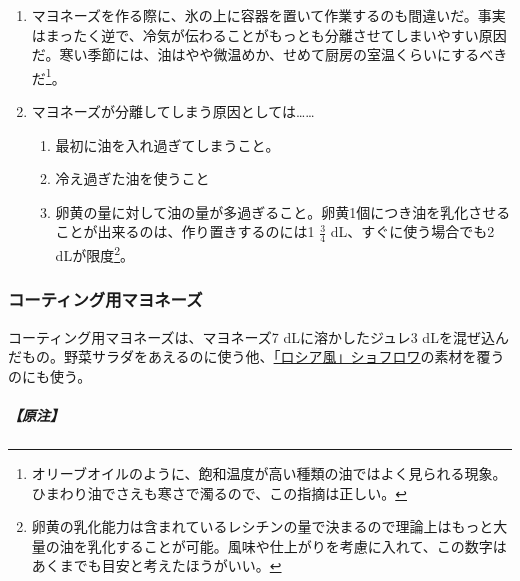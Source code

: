 \begin{recette}
\begin{enumerate}
\def\labelenumi{\arabic{enumi}.}
\setcounter{enumi}{1}
\item
  マヨネーズを作る際に、氷の上に容器を置いて作業するのも間違いだ。事実はまったく逆で、冷気が伝わることがもっとも分離させてしまいやすい原因だ。寒い季節には、油はやや微温めか、せめて厨房の室温くらいにするべきだ\footnote{オリーブオイルのように、飽和温度が高い種類の油ではよく見られる現象。ひまわり油でさえも寒さで濁るので、この指摘は正しい。}。
\item
  マヨネーズが分離してしまう原因としては\ldots{}\ldots{}

  \begin{enumerate}
  \def\labelenumii{\arabic{enumii}.}
  \tightlist
  \item
    最初に油を入れ過ぎてしまうこと。
  \item
    冷え過ぎた油を使うこと
  \item
    卵黄の量に対して油の量が多過ぎること。卵黄1個につき油を乳化させることが出来るのは、作り置きするのには1
    \(\frac{3}{4}\) dL、すぐに使う場合でも2 dLが限度\footnote{卵黄の乳化能力は含まれているレシチンの量で決まるので理論上はもっと大量の油を乳化することが可能。風味や仕上がりを考慮に入れて、この数字はあくまでも目安と考えたほうがいい。}。
  \end{enumerate}
\end{enumerate}

\atoaki{}

\hypertarget{mayonnaise-collee}{%
\subsubsection{コーティング用マヨネーズ}\label{mayonnaise-collee}}



コーティング用マヨネーズは、マヨネーズ7 dLに溶かしたジュレ3
dLを混ぜ込んだもの。野菜サラダをあえるのに使う他、\protect\hyperlink{}{「ロシア風」ショフロワ}の素材を覆うのにも使う。

\hypertarget{nota-mayonnaise-collee}{%
\subparagraph{【原注】}\label{nota-mayonnaise-collee}}


\end{recette}
